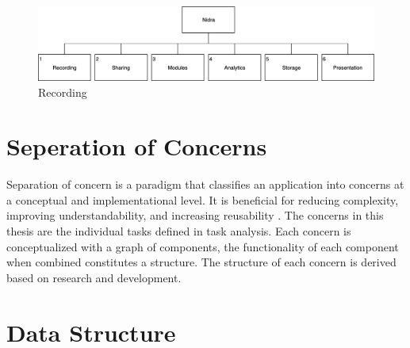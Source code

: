 \begin{figure}
    \centering
    \includegraphics[scale=0.23]{images/TA.png}
    \caption{Recording}
    \label{fig:hta_overview}
\end{figure}



\section{Seperation of Concerns}
Separation of concern is a paradigm that classifies an application into concerns at a conceptual and implementational level. It is beneficial for reducing complexity, improving understandability, and increasing reusability \cite{soc}. The concerns in this thesis are the individual tasks defined in task analysis. Each concern is conceptualized with a graph of components, the functionality of each component when combined constitutes a structure. The structure of each concern is derived based on research and development. 



\section{Data Structure}

